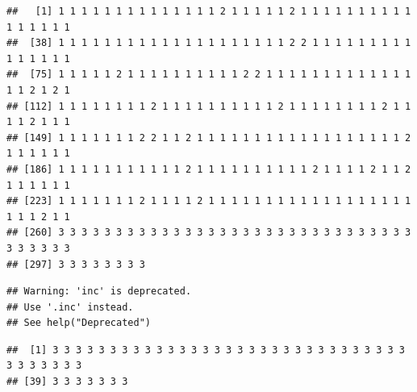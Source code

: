 \documentclass[
]{book}
\newenvironment{Shaded}{\begin{snugshade}}{\end{snugshade}}
\newcommand{\CommentTok}[1]{\textcolor[rgb]{0.56,0.35,0.01}{\textit{#1}}}
\newcommand{\DecValTok}[1]{\textcolor[rgb]{0.00,0.00,0.81}{#1}}
\newcommand{\FunctionTok}[1]{\textcolor[rgb]{0.13,0.29,0.53}{\textbf{#1}}}
\newcommand{\NormalTok}[1]{#1}
\newcommand{\OtherTok}[1]{\textcolor[rgb]{0.56,0.35,0.01}{#1}}
\newcommand{\SpecialCharTok}[1]{\textcolor[rgb]{0.81,0.36,0.00}{\textbf{#1}}}
\newcommand{\StringTok}[1]{\textcolor[rgb]{0.31,0.60,0.02}{#1}}
\begin{document}
\begin{Shaded}
\end{Shaded}

\begin{verbatim}
##   [1] 1 1 1 1 1 1 1 1 1 1 1 1 1 1 2 1 1 1 1 1 2 1 1 1 1 1 1 1 1 1 1 1 1 1 1 1 1
##  [38] 1 1 1 1 1 1 1 1 1 1 1 1 1 1 1 1 1 1 1 1 2 2 1 1 1 1 1 1 1 1 1 1 1 1 1 1 1
##  [75] 1 1 1 1 1 2 1 1 1 1 1 1 1 1 1 1 2 2 1 1 1 1 1 1 1 1 1 1 1 1 1 1 1 2 1 2 1
## [112] 1 1 1 1 1 1 1 1 2 1 1 1 1 1 1 1 1 1 1 2 1 1 1 1 1 1 1 1 2 1 1 1 1 2 1 1 1
## [149] 1 1 1 1 1 1 1 2 2 1 1 2 1 1 1 1 1 1 1 1 1 1 1 1 1 1 1 1 1 1 2 1 1 1 1 1 1
## [186] 1 1 1 1 1 1 1 1 1 1 1 2 1 1 1 1 1 1 1 1 1 1 2 1 1 1 1 2 1 1 2 1 1 1 1 1 1
## [223] 1 1 1 1 1 1 1 2 1 1 1 1 2 1 1 1 1 1 1 1 1 1 1 1 1 1 1 1 1 1 1 1 1 1 2 1 1
## [260] 3 3 3 3 3 3 3 3 3 3 3 3 3 3 3 3 3 3 3 3 3 3 3 3 3 3 3 3 3 3 3 3 3 3 3 3 3
## [297] 3 3 3 3 3 3 3 3
\end{verbatim}

\begin{Shaded}
\end{Shaded}

\begin{verbatim}
## Warning: 'inc' is deprecated.
## Use '.inc' instead.
## See help("Deprecated")
\end{verbatim}

\begin{verbatim}
##  [1] 3 3 3 3 3 3 3 3 3 3 3 3 3 3 3 3 3 3 3 3 3 3 3 3 3 3 3 3 3 3 3 3 3 3 3 3 3 3
## [39] 3 3 3 3 3 3 3
\end{verbatim}
\end{document}
